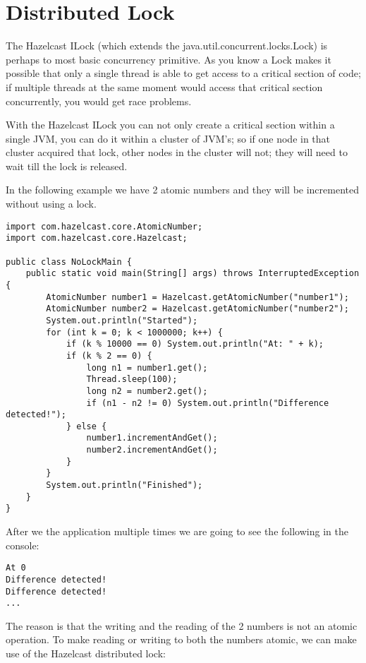 \section{Distributed Lock}

The Hazelcast ILock (which extends the java.util.concurrent.locks.Lock) is perhaps
to most basic concurrency primitive. As you know a Lock makes it possible that only
a single thread is able to get access to a critical section of code; if multiple threads
at the same moment would access that critical section concurrently, you would get race 
problems. 

With the Hazelcast ILock you can not only create a critical section within a single JVM,
you can do it within a cluster of JVM's; so if one node in that cluster acquired that lock,
other nodes in the cluster will not; they will need to wait till the lock is released.

In the following example we have 2 atomic numbers and they will be incremented without
using a lock.
\begin{verbatim}
import com.hazelcast.core.AtomicNumber;
import com.hazelcast.core.Hazelcast;

public class NoLockMain {
    public static void main(String[] args) throws InterruptedException {
        AtomicNumber number1 = Hazelcast.getAtomicNumber("number1");
        AtomicNumber number2 = Hazelcast.getAtomicNumber("number2");
        System.out.println("Started");
        for (int k = 0; k < 1000000; k++) {
            if (k % 10000 == 0) System.out.println("At: " + k);
            if (k % 2 == 0) {
                long n1 = number1.get();
                Thread.sleep(100);
                long n2 = number2.get();
                if (n1 - n2 != 0) System.out.println("Difference detected!");
            } else {
                number1.incrementAndGet();
                number2.incrementAndGet();
            }
        }
        System.out.println("Finished");
    }
}
\end{verbatim}

After we the application multiple times we are going to see the following 
in the console:
\begin{verbatim}
At 0
Difference detected!
Difference detected!
...
\end{verbatim}	

The reason is that the writing and the reading of the 2 numbers is not an atomic
operation. To make reading or writing to both the numbers atomic, we can make use 
of the Hazelcast distributed lock:

